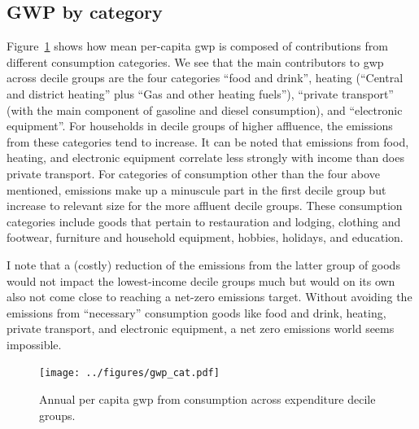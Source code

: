 \documentclass[a4paper,11pt,abstract=true]{scrartcl}
\begin{document}


\clearpage
\subsection{{GWP} by category}

Figure~\ref{fig:gwp_cat} shows how mean per-capita \ac{gwp} is composed of contributions from different consumption categories.
We see that the main contributors to \ac{gwp} across decile groups are the four categories ``food and drink'', heating (``Central and district heating'' plus ``Gas and other heating fuels''), ``private transport'' (with the main component of gasoline and diesel consumption), and ``electronic equipment''.
For households in decile groups of higher affluence, the emissions from these categories tend to increase.
It can be noted that emissions from food, heating, and electronic equipment correlate less strongly with income than does private transport.
For categories of consumption other than the four above mentioned, emissions make up a minuscule part in the first decile group but increase to relevant size for the more affluent decile groups.
These consumption categories include goods that pertain to restauration and lodging, clothing and footwear, furniture and household equipment, hobbies, holidays, and education.

I note that a (costly) reduction of the emissions from the latter group of goods would not impact the lowest-income decile groups much but would on its own also not come close to reaching a net-zero emissions target.
Without avoiding the emissions from ``necessary'' consumption goods like food and drink, heating, private transport, and electronic equipment, a net zero emissions world seems impossible.

\begin{figure}[htp]
  \centering
  \texttt{[image: ../figures/gwp\_cat.pdf]}
  \caption[\ac{gwp} per decile]{
    Annual per capita \ac{gwp} from consumption across expenditure decile groups.
  }
  \label{fig:gwp_cat}
\end{figure}
\end{document}
